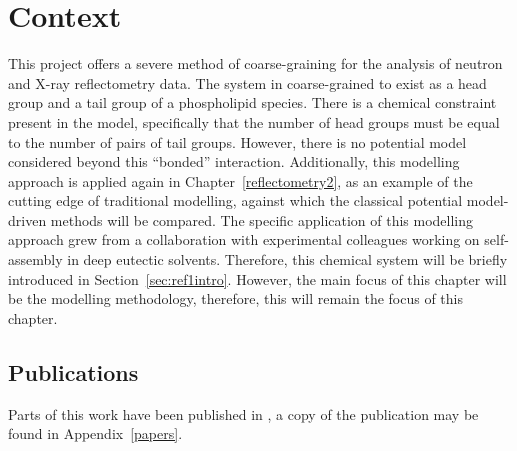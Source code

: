 \section*{Context}
This project offers a severe method of coarse-graining for the analysis of neutron and X-ray reflectometry data.
The system in coarse-grained to exist as a head group and a tail group of a phospholipid species.
There is a chemical constraint present in the model, specifically that the number of head groups must be equal to the number of pairs of tail groups.
However, there is no potential model considered beyond this ``bonded'' interaction.
Additionally, this modelling approach is applied again in Chapter~\ref{reflectometry2}, as an example of the cutting edge of traditional modelling, against which the classical potential model-driven methods will be compared.
The specific application of this modelling approach grew from a collaboration with experimental colleagues working on self-assembly in deep eutectic solvents.
Therefore, this chemical system will be briefly introduced in Section~\ref{sec:ref1intro}.
However, the main focus of this chapter will be the modelling methodology, therefore, this will remain the focus of this chapter.

\subsection*{Publications}
Parts of this work have been published in , a copy of the publication may be found in Appendix~\ref{papers}.
